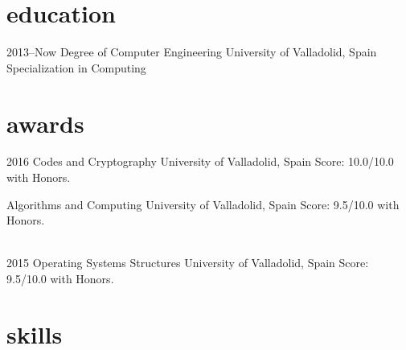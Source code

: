 \documentclass[]{friggeri-cv} %
\begin{document}
\section{education}

\begin{entrylist}


\entry
{2013--Now}
{Degree {\normalfont of Computer Engineering} }
{University of Valladolid, Spain}
{Specialization in Computing}



\end{entrylist}



\section{awards}

\begin{entrylist}


\entry
{2016}
{Codes and Cryptography}
{University of Valladolid, Spain}
{Score: 10.0/10.0 with Honors.}

\entry
{}
{Algorithms and Computing}
{University of Valladolid, Spain}
{Score: 9.5/10.0 with Honors.} 

\\
\entry
{2015}
{Operating Systems Structures}
{University of Valladolid, Spain}
{Score: 9.5/10.0 with Honors.}


\end{entrylist}


\section{skills}



\newpage
\end{document}
